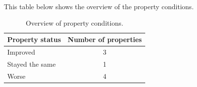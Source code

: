 This table below shows the overview of the property conditions.

\begin{table}[ht]
\centering
\caption{Overview of property conditions.}
\label{tab:property_summary}
\begin{tabular}{lc}
\toprule
Property status & Number of properties \\
\midrule
Improved & 3 \\
Stayed the same & 1 \\
Worse & 4 \\
\bottomrule
\end{tabular}
\end{table}